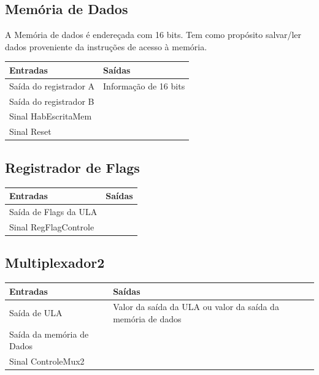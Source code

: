 \documentclass{article}
\begin{document}
  \subsection{Memória de Dados}
    A Memória de dados é endereçada com 16 bits. Tem como propósito salvar/ler dados proveniente da instruções de acesso à memória.
  \FloatBarrier
    \begin{table}[H]
      \begin{center}
        \begin{tabular}[pos]{|m{7cm} | m{7cm}|} 
          \hline
          \cellcolor[gray]{0.9}\textbf{Entradas} & \cellcolor[gray]{0.9}\textbf{Saídas} \\ \hline
            Saída do registrador A & Informação de 16 bits\\ \hline
            Saída do registrador B & \\ \hline
            Sinal HabEscritaMem & \\ \hline
            Sinal Reset & \\ \hline
        \end{tabular}
      \end{center}
    \end{table}  
    
 \subsection{Registrador de Flags}
  \FloatBarrier
    \begin{table}[H]
      \begin{center}
        \begin{tabular}[pos]{|m{7cm} | m{7cm}|} 
          \hline
          \cellcolor[gray]{0.9}\textbf{Entradas} & \cellcolor[gray]{0.9}\textbf{Saídas} \\ \hline
            Saída de Flags da ULA & \\ \hline
            Sinal RegFlagControle & \\ \hline
        \end{tabular}
      \end{center}
    \end{table}  
    
 \subsection{Multiplexador2}
  \FloatBarrier
    \begin{table}[H]
      \begin{center}
        \begin{tabular}[pos]{|m{7cm} | m{7cm}|} 
          \hline
          \cellcolor[gray]{0.9}\textbf{Entradas} & \cellcolor[gray]{0.9}\textbf{Saídas} \\ \hline
            Saída de ULA & Valor da saída da ULA ou valor da saída da memória de dados\\ \hline
            Saída da memória de Dados & \\ \hline
            Sinal ControleMux2 & \\ \hline
        \end{tabular}
      \end{center}
    \end{table}  
    \newpage
\end{document}
